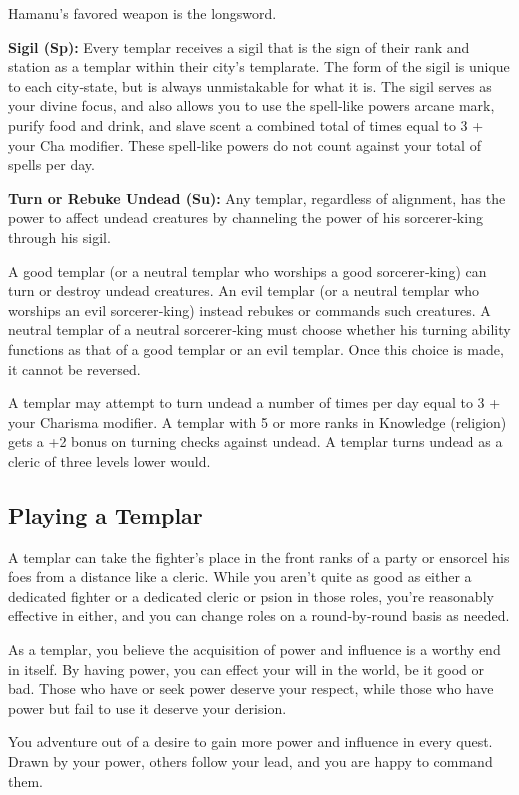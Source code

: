 Hamanu's favored weapon is the longsword.

\textbf{Sigil (Sp):} Every templar receives a sigil that is the sign of their rank and station as a templar within their city's templarate. The form of the sigil is unique to each city‐state, but is always unmistakable for what it is. The sigil serves as your divine focus, and also allows you to use the spell‐like powers arcane mark, purify food and drink, and slave scent a combined total of times equal to 3 + your Cha modifier. These spell‐like powers do not count against your total of spells per day.

\textbf{Turn or Rebuke Undead (Su):} Any templar, regardless of alignment, has the power to affect undead creatures by channeling the power of his sorcerer‐king through his sigil.

A good templar (or a neutral templar who worships a good sorcerer‐king) can turn or destroy undead creatures. An evil templar (or a neutral templar who worships an evil sorcerer‐king) instead rebukes or commands such creatures. A neutral templar of a neutral sorcerer‐king must choose whether his turning ability functions as that of a good templar or an evil templar. Once this choice is made, it cannot be reversed.

A templar may attempt to turn undead a number of times per day equal to 3 + your Charisma modifier. A templar with 5 or more ranks in Knowledge (religion) gets a +2 bonus on turning checks against undead. A templar turns undead as a cleric of three levels lower would.

\subsection{Playing a Templar}

A templar can take the fighter's place in the front ranks of a party or ensorcel his foes from a distance like a cleric. While you aren't quite as good as either a dedicated fighter or a dedicated cleric or psion in those roles, you're reasonably effective in either, and you can change roles on a round‐by‐round basis as needed.

As a templar, you believe the acquisition of power and influence is a worthy end in itself. By having power, you can effect your will in the world, be it good or bad. Those who have or seek power deserve your respect, while those who have power but fail to use it deserve your derision.

You adventure out of a desire to gain more power and influence in every quest. Drawn by your power, others follow your lead, and you are happy to command them.

